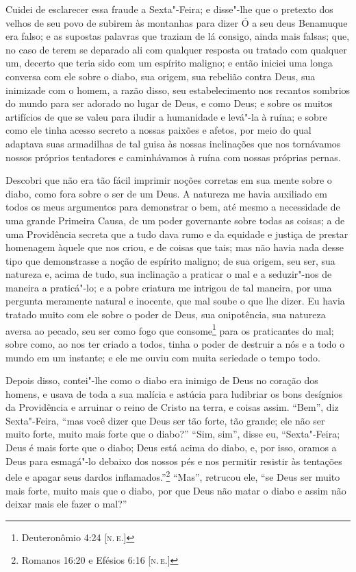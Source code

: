 Cuidei de esclarecer essa fraude a Sexta"-Feira; e disse"-lhe que o
pretexto dos velhos de seu povo de subirem às montanhas para dizer Ó a
seu deus Benamuque era falso; e as supostas palavras que traziam de lá
consigo, ainda mais falsas; que, no caso de terem se deparado ali com
qualquer resposta ou tratado com qualquer um, decerto que teria sido com
um espírito maligno; e então iniciei uma longa conversa com ele sobre o
diabo, sua origem, sua rebelião contra Deus, sua inimizade com o homem,
a razão disso, seu estabelecimento nos recantos sombrios do mundo para
ser adorado no lugar de Deus, e como Deus; e sobre os muitos artifícios
de que se valeu para iludir a humanidade e levá"-la à ruína; e sobre como
ele tinha acesso secreto a nossas paixões e afetos, por meio do qual
adaptava suas armadilhas de tal guisa às nossas inclinações que nos
tornávamos nossos próprios tentadores e caminhávamos à ruína com nossas
próprias pernas.

Descobri que não era tão fácil imprimir noções corretas em sua mente
sobre o diabo, como fora sobre o ser de um Deus. A natureza me havia
auxiliado em todos os meus argumentos para demonstrar o bem, até mesmo a
necessidade de uma grande Primeira Causa, de um poder governante sobre
todas as coisas; a de uma Providência secreta que a tudo dava rumo e da
equidade e justiça de prestar homenagem àquele que nos criou, e de
coisas que tais; mas não havia nada desse tipo que demonstrasse a noção
de espírito maligno; de sua origem, seu ser, sua natureza e, acima de
tudo, sua inclinação a praticar o mal e a seduzir"-nos de maneira a
praticá"-lo; e a pobre criatura me intrigou de tal maneira, por uma
pergunta meramente natural e inocente, que mal soube o que lhe dizer. Eu
havia tratado muito com ele sobre o poder de Deus, sua onipotência, sua
natureza aversa ao pecado, seu ser como fogo que consome\footnote{Deuteronômio
  4:24 {[}\textsc{n.\,e.}{]}} para os praticantes do mal; sobre como, ao nos ter
criado a todos, tinha o poder de destruir a nós e a todo o mundo em um
instante; e ele me ouviu com muita seriedade o tempo todo.

Depois disso, contei"-lhe como o diabo era inimigo de Deus no coração dos
homens, e usava de toda a sua malícia e astúcia para ludibriar os bons
desígnios da Providência e arruinar o reino de Cristo na terra, e coisas
assim. ``Bem'', diz Sexta"-Feira, ``mas você dizer que Deus ser tão
forte, tão grande; ele não ser muito forte, muito mais forte que o
diabo?'' ``Sim, sim'', disse eu, ``Sexta"-Feira; Deus é mais forte que o
diabo; Deus está acima do diabo, e, por isso, oramos a Deus para
esmagá"-lo debaixo dos nossos pés e nos permitir resistir às tentações
dele e apagar seus dardos inflamados.''\footnote{Romanos 16:20 e Efésios
  6:16 {[}\textsc{n.\,e.}{]}} ``Mas'', retrucou ele, ``se Deus ser muito mais
forte, muito mais que o diabo, por que Deus não matar o diabo e assim
não deixar mais ele fazer o mal?''

